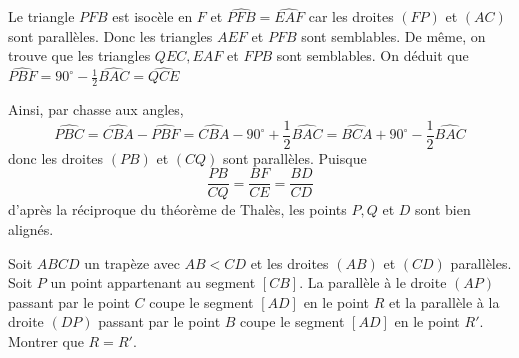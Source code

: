\begin{sol}
\begin{center}
\end{center}

Le triangle $PFB$ est isocèle en $F$ et $\widehat{PFB}=\widehat{EAF}$ car les droites $(FP)$ et $(AC)$ sont parallèles. Donc les triangles $AEF$ et $PFB$ sont semblables. De même, on trouve que les triangles $QEC, EAF$ et $FPB$ sont semblables. On déduit que $\widehat{PBF}=90^\circ-\frac1{2}\widehat{BAC}=\widehat{QCE}$ 

Ainsi, par chasse aux angles, $$\widehat{PBC}=\widehat{CBA}-\widehat{PBF}=\widehat{CBA}-90^\circ+\frac1{2}\widehat{BAC}=\widehat{BCA}+90^\circ-\frac1{2}\widehat{BAC}$$
donc les droites $(PB)$ et $(CQ)$ sont parallèles. Puisque 
$$\frac{PB}{CQ}=\frac{BF}{CE}=\frac{BD}{CD}$$ d'après la réciproque du théorème de Thalès, les points $P,Q$ et $D$ sont bien alignés. 
\end{sol}

\begin{exo}
Soit $ABCD$ un trapèze avec $AB<CD$ et les droites $(AB)$ et $(CD)$ parallèles. Soit $P$ un point appartenant au segment $[CB]$. La parallèle à le droite $(AP)$ passant par le point $C$ coupe le segment $[AD]$ en le point $R$ et la parallèle à la droite $(DP)$ passant par le point $B$ coupe le segment $[AD]$ en le point $R'$. Montrer que $R=R'$.
\end{exo}


